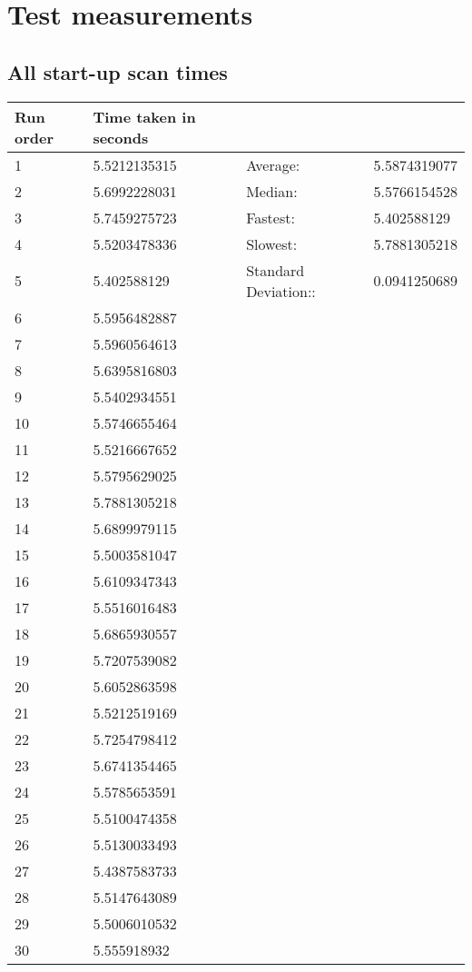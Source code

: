 \section{Test measurements} \label{testMeasurements}

\subsection{All start-up scan times}

\begin{longtable}{l|l|ll}
Run order & Time taken in seconds &  &  \\
\endfirsthead
%
\endhead
%
1 & 5.5212135315 & Average: & 5.5874319077 \\
2 & 5.6992228031 & Median: & 5.5766154528 \\
3 & 5.7459275723 & Fastest: & 5.402588129 \\
4 & 5.5203478336 & Slowest: & 5.7881305218 \\
5 & 5.402588129 & Standard Deviation:: & 0.0941250689 \\
6 & 5.5956482887 &  &  \\
7 & 5.5960564613 &  &  \\
8 & 5.6395816803 &  &  \\
9 & 5.5402934551 &  &  \\
10 & 5.5746655464 &  &  \\
11 & 5.5216667652 &  &  \\
12 & 5.5795629025 &  &  \\
13 & 5.7881305218 &  &  \\
14 & 5.6899979115 &  &  \\
15 & 5.5003581047 &  &  \\
16 & 5.6109347343 &  &  \\
17 & 5.5516016483 &  &  \\
18 & 5.6865930557 &  &  \\
19 & 5.7207539082 &  &  \\
20 & 5.6052863598 &  &  \\
21 & 5.5212519169 &  &  \\
22 & 5.7254798412 &  &  \\
23 & 5.6741354465 &  &  \\
24 & 5.5785653591 &  &  \\
25 & 5.5100474358 &  &  \\
26 & 5.5130033493 &  &  \\
27 & 5.4387583733 &  &  \\
28 & 5.5147643089 &  &  \\
29 & 5.5006010532 &  &  \\
30 & 5.555918932 &  & 
\end{longtable}

